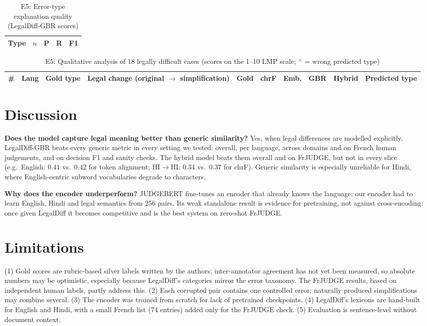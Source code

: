 \begin{table}[t]
\caption{E5: Error-type explanation quality (LegalDiff-GBR scores)}\label{tab:explain}
\centering\footnotesize
\begin{tabular}{@{}lcccc@{}}
\toprule
Type & $n$ & P & R & F1\\
\midrule

\bottomrule
\end{tabular}
\end{table}

\begin{table}[t]
\caption{E5: Qualitative analysis of 18 legally difficult cases (scores on the 1--10 LMP scale; $^{\times}$ = wrong predicted type)}\label{tab:cases}
\centering\footnotesize\setlength{\tabcolsep}{4pt}
\begin{tabular}{@{}rllp{7.4cm}rrrrrl@{}}
\toprule
\# & Lang & Gold type & Legal change (original $\rightarrow$ simplification) & Gold & chrF & Emb. & GBR & Hybrid & Predicted type\\
\midrule

\bottomrule
\end{tabular}
\end{table}

\section{Discussion}
\textbf{Does the model capture legal meaning better than generic similarity?} Yes, when legal differences are modelled explicitly. LegalDiff-GBR beats every generic metric in every setting we tested: overall, per language, across domains and on French human judgements, and on decision F1 and sanity checks. The hybrid model beats them overall and on FrJUDGE, but not in every slice (e.g.\ English: $0.41$ vs.\ $0.42$ for token alignment; HI$\rightarrow$HI: $0.34$ vs.\ $0.37$ for chrF). Generic similarity is especially unreliable for Hindi, where English-centric subword vocabularies degrade to characters.

\textbf{Why does the encoder underperform?} JUDGEBERT fine-tunes an encoder that already knows the language; our encoder had to learn English, Hindi and legal semantics from 256 pairs. Its weak standalone result is evidence for pretraining, not against cross-encoding: once given LegalDiff it becomes competitive and is the best system on zero-shot FrJUDGE.

\section{Limitations}\label{sec:limits}
(1) Gold scores are rubric-based silver labels written by the authors; inter-annotator agreement has not yet been measured, so absolute numbers may be optimistic, especially because LegalDiff's categories mirror the error taxonomy. The FrJUDGE results, based on independent human labels, partly address this. (2) Each corrupted pair contains one controlled error; naturally produced simplifications may combine several. (3) The encoder was trained from scratch for lack of pretrained checkpoints. (4) LegalDiff's lexicons are hand-built for English and Hindi, with a small French list (74 entries) added only for the FrJUDGE check. (5) Evaluation is sentence-level without document context.

